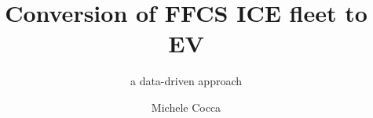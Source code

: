 \documentclass[%
   corpo=12pt, %
   twoside, %
   tipotesi=scudo,
   mybibliostyle, %
  numerazioneromana, %
   ]{toptesi}
\begin{document}
\begin{ThesisTitlePage}
\author{Michele Cocca}
\title{Conversion of FFCS ICE fleet to EV}
\subtitle{a data-driven approach}
%

\end{ThesisTitlePage}
\end{document}
